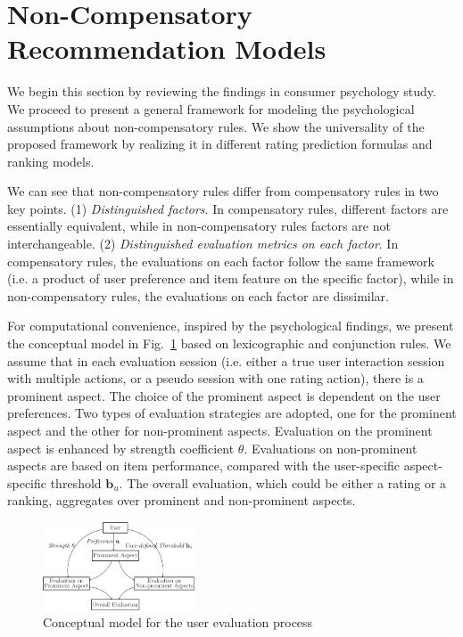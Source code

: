 \documentclass[letterpaper]{article} %
\begin{document}
\section{Non-Compensatory Recommendation Models}\label{sec:Nmodel}
We begin this section by reviewing the findings in consumer psychology study. We proceed to present a general framework for modeling the psychological assumptions about non-compensatory rules. We show the universality of the proposed framework by realizing it in different rating prediction formulas and ranking models.

We can see that non-compensatory rules differ from compensatory rules in two key points. (1) \textit{Distinguished factors}. In compensatory rules, different factors are essentially equivalent, while in non-compensatory rules factors are not interchangeable. (2) \textit{Distinguished evaluation metrics on each factor}. In compensatory rules, the evaluations on each factor follow the same framework (i.e. a product of user preference and item feature on the specific factor), while in non-compensatory rules, the evaluations on each factor are dissimilar.  

For computational convenience, inspired by the psychological findings, we present the conceptual model in Fig.~\ref{fig:model} based on lexicographic and conjunction rules. We assume that in each evaluation session (i.e. either a true user interaction session with multiple actions, or a pseudo session with one rating action), there is a prominent aspect. The choice of the prominent aspect is dependent on the user preferences. Two types of evaluation strategies are adopted, one for the prominent aspect and the other for non-prominent aspects. Evaluation on the prominent aspect is enhanced by strength coefficient $\theta$. Evaluations on non-prominent aspects are based on item performance, compared with the user-specific aspect-specific threshold $\mathbf{b}_u$. The overall evaluation, which could be either a rating or a ranking, aggregates over prominent and non-prominent aspects. 

\begin{figure}[htbp]
\centering
\includegraphics[width=0.4\textwidth]{conceptualmodel.pdf}
\caption{Conceptual model for the user evaluation process}
\label{fig:model}
\end{figure}
\end{document}
